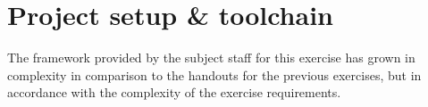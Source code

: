 \section{Project setup \& toolchain}
\label{project-setup-toolchain}

The framework provided by the subject staff for this exercise has grown in complexity in comparison to the handouts for the previous exercises, but in accordance with the complexity of the exercise requirements.
